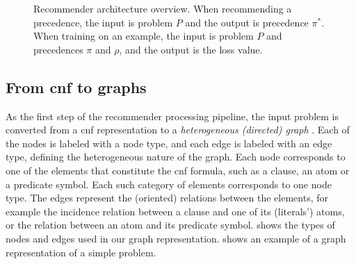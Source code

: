 \begin{figure}[h]
\caption{Recommender architecture overview.
When recommending a precedence, the input is problem $P$ and the output is precedence $\pi^*$.
When training on an example, the input is problem $P$ and precedences $\pi$ and $\rho$,
and the output is the loss value.}
\label{fig:architecture}
\centering
{}
\end{figure}

\subsection{From \gls{cnf} to graphs}
\label{sec:graphifier}

As the first step of the recommender processing pipeline,
the input problem is converted from a \gls{cnf} representation
to a \emph{heterogeneous (directed) graph} \cite{Zhou2018}.
Each of the nodes is labeled with a node type,
and each edge is labeled with an edge type,
defining the heterogeneous nature of the graph.
Each node corresponds to one of the elements that constitute the \gls{cnf} formula,
such as a clause, an atom or a predicate symbol.
Each such category of elements corresponds to one node type.
The edges represent the (oriented) relations between the elements,
for example the incidence relation between a clause and one of its (literals') atoms,
or the relation between an atom and its predicate symbol.
 shows the types of nodes and edges used in our graph representation.
 shows an example of a graph representation of a simple problem.

